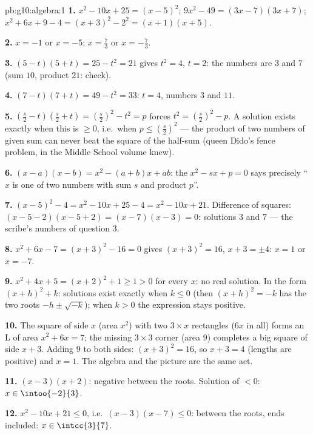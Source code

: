 \begin{solution}{pb:g10:algebra:1}
\textbf{1.} $x^2 - 10x + 25 = (x - 5)^2$;
$9x^2 - 49 = (3x - 7)(3x + 7)$;
$x^2 + 6x + 9 - 4 = (x + 3)^2 - 2^2 = (x + 1)(x + 5)$.

\textbf{2.} $x = -1$ or $x = -5$; \quad $x = \frac73$ or
$x = -\frac73$.

\textbf{3.} $(5 - t)(5 + t) = 25 - t^2 = 21$ gives $t^2 = 4$,
$t = 2$: the numbers are $3$ and $7$ (sum $10$, product $21$:
check).

\textbf{4.} $(7 - t)(7 + t) = 49 - t^2 = 33$: $t = 4$, numbers
$3$ and $11$.

\textbf{5.} $\left(\frac s2 - t\right)\left(\frac s2 + t\right)
= \left(\frac s2\right)^2 - t^2 = p$ forces
$t^2 = \left(\frac s2\right)^2 - p$. A solution exists exactly
when this is $\geq 0$, i.e.\ when
$p \leq \left(\frac s2\right)^2$ --- the product of two numbers
of given sum can never beat the square of the half-sum
(queen Dido's fence problem, in the Middle School volume knew).

\textbf{6.} $(x - a)(x - b) = x^2 - (a + b)x + ab$: the
 $x^2 - sx + p = 0$ says precisely ``$x$ is one of two
numbers with sum $s$ and product $p$''.

\textbf{7.} $(x-5)^2 - 4 = x^2 - 10x + 25 - 4 = x^2 - 10x +
21$. Difference of squares:
$(x - 5 - 2)(x - 5 + 2) = (x - 7)(x - 3) = 0$: solutions $3$
and $7$ --- the scribe's numbers of question 3.

\textbf{8.} $x^2 + 6x - 7 = (x + 3)^2 - 16 = 0$ gives
$(x + 3)^2 = 16$, $x + 3 = \pm 4$: $x = 1$ or $x = -7$.

\textbf{9.} $x^2 + 4x + 5 = (x + 2)^2 + 1 \geq 1 > 0$ for every
$x$: no real solution. In the form $(x + h)^2 + k$: solutions
exist exactly when $k \leq 0$ (then $(x+h)^2 = -k$ has the two
roots $-h \pm \sqrt{-k}$); when $k > 0$ the expression stays
positive.

\textbf{10.} The square of side $x$ (area $x^2$) with two
$3 \times x$ rectangles ($6x$ in all) forms an L of area
$x^2 + 6x = 7$; the missing $3 \times 3$ corner (area $9$)
completes a big square of side $x + 3$. Adding $9$ to both
sides: $(x + 3)^2 = 16$, so $x + 3 = 4$ (lengths are positive)
and $x = 1$. The algebra and the picture are the same act.

\textbf{11.} $(x-3)(x+2)$: negative between the roots. Solution
of $< 0$: $x \in \intoo{-2}{3}$.

\textbf{12.} $x^2 - 10x + 21 \leq 0$, i.e.\
$(x - 3)(x - 7) \leq 0$: between the roots, ends included:
$x \in \intcc{3}{7}$.


\end{solution}
